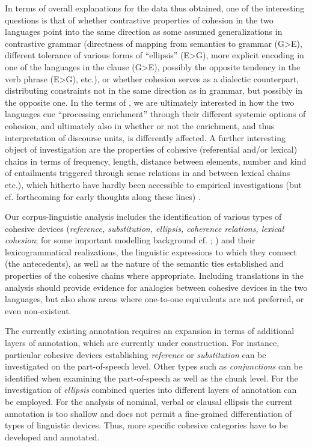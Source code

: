 \documentclass[output=paper]{LSP/langsci}
\begin{document}
In terms of overall explanations for the data thus obtained, one of the interesting questions is that of whether contrastive properties of cohesion in the two languages point into the same direction as some assumed generalizations in contrastive grammar (directness of mapping from semantics to grammar (G{\textgreater}E), different tolerance of various forms of ``ellipsis'' (E{\textgreater}G), more explicit encoding in one of the languages in the clause (G{\textgreater}E), possibly the opposite tendency in the verb phrase (E{\textgreater}G), etc.), or whether cohesion serves as a dialectic counterpart, distributing constraints not in the same direction as in grammar, but possibly in the opposite one. In the terms of \citet[44ff]{Hawkins2004}, we are ultimately interested in how the two languages cue ``processing enrichment'' through their different systemic options of cohesion, and ultimately also in whether or not the enrichment, and thus interpretation of discourse units, is differently affected. A further interesting object of investigation are the properties of cohesive (referential and/or lexical) chains in terms of frequency, length, distance between elements, number and kind of entailments triggered through sense relations in and between lexical chains etc.), which hitherto have hardly been accessible to empirical investigations (but cf. \citealt{Hansen-SchirraEtAl2007} forthcoming for early thoughts along these lines) .

Our corpus-linguistic analysis includes the identification of various types of cohesive devices (\textit{reference, substitution, ellipsis, coherence relations, lexical cohesion}; for some important modelling background cf. \citealt{Halliday1976}; \citealt[524ff]{Halliday2004}) and their lexicogrammatical realizations, the linguistic expressions to which they connect (the antecedents), as well as the nature of the semantic ties established and properties of the cohesive chains where appropriate. Including translations in the analysis should provide evidence for analogies between cohesive devices in the two languages, but also show areas where one-to-one equivalents are not preferred, or even non-existent. 

The currently existing annotation requires an expansion in terms of additional layers of annotation, which are currently under construction. For instance, particular cohesive devices establishing \textit{reference} or \textit{substitution} can be investigated on the part-of-speech level. Other types such as\textit{ conjunctions} can be identified when examining the part-of-speech as well as the chunk level. For the investigation of \textit{ellipsis} combined queries into different layers of annotation can be employed. For the analysis of nominal, verbal or clausal ellipsis the current annotation is too shallow and does not permit a fine-grained differentiation of types of linguistic devices. Thus, more specific cohesive categories have to be developed and annotated. 
\end{document}
